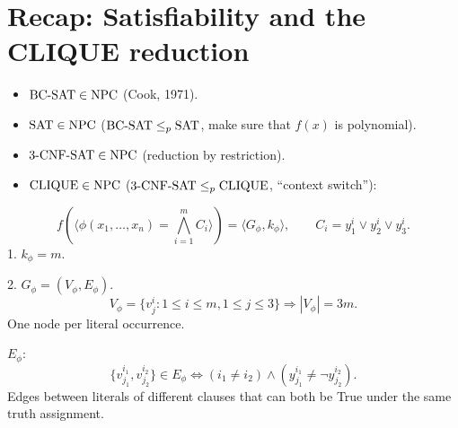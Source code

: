 \section{Recap: Satisfiability and the CLIQUE reduction}
\begin{itemize}
\item $\mathrm{BC\text{-}SAT}\in\mathrm{NPC}$ (Cook, 1971).
\item $\mathrm{SAT}\in\mathrm{NPC}$ ($\mathrm{BC\text{-}SAT}\leq_p\mathrm{SAT}$, make sure that $f(x)$ is polynomial).
\item $\mathrm{3\text{-}CNF\text{-}SAT}\in\mathrm{NPC}$ (reduction by restriction).
\item $\mathrm{CLIQUE}\in\mathrm{NPC}$ ($\mathrm{3\text{-}CNF\text{-}SAT}\leq_p\mathrm{CLIQUE}$, ``context switch''):
\end{itemize}
\[
f(\langle\phi(x_1,\ldots,x_n)=\bigwedge_{i=1}^m C_i\rangle)=\langle G_\phi,k_\phi\rangle,\qquad C_i=y_1^i\lor y_2^i\lor y_3^i.
\]
1. $k_\phi=m$.

2. $G_\phi=(V_\phi,E_\phi)$.
\[
V_\phi=\{v_j^i:1\leq i\leq m,1\leq j\leq3\}\Rightarrow|V_\phi|=3m.
\]
One node per literal occurrence.

$E_\phi$:
\[
\{v_{j_1}^{i_1},v_{j_2}^{i_2}\}\in E_\phi\Longleftrightarrow(i_1\neq i_2)\land(y_{j_1}^{i_1}\neq\neg y_{j_2}^{i_2}).
\]
Edges between literals of different clauses that can both be True under the same truth assignment.

